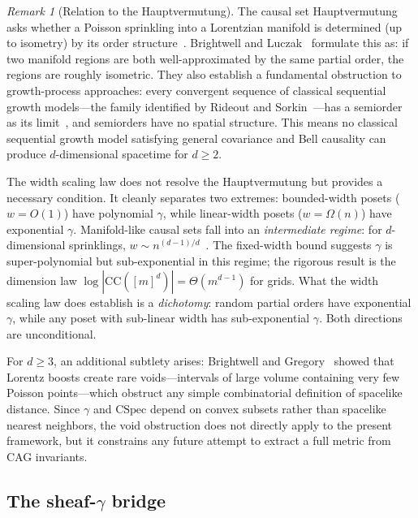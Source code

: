 \documentclass[11pt,a4paper]{article}
\theoremstyle{plain}
\theoremstyle{definition}
\theoremstyle{remark}
\newtheorem{remark}[theorem]{Remark}
\newcommand{\CSpec}{\mathrm{CSpec}}
\newcommand{\CC}{\mathrm{CC}}
\begin{document}
\begin{remark}[Relation to the Hauptvermutung]
The causal set Hauptvermutung asks whether a Poisson sprinkling into a Lorentzian manifold is determined (up to isometry) by its order structure~\cite{bombelli1987, sorkin2003, malament1977}.
Brightwell and Luczak~\cite{brightwell2015} formulate this as: if two manifold regions are both well-approximated by the same partial order, the regions are roughly isometric.
They also establish a fundamental obstruction to growth-process approaches: every convergent sequence of classical sequential growth models---the family identified by Rideout and Sorkin~\cite{rideout2000}---has a semiorder as its limit~\cite{brightwell2010}, and semiorders have no spatial structure.
This means no classical sequential growth model satisfying general covariance and Bell causality can produce $d$-dimensional spacetime for $d \geq 2$.

The width scaling law does not resolve the Hauptvermutung but provides a necessary condition.
It cleanly separates two extremes: bounded-width posets ($w = O(1)$) have polynomial $\gamma$, while linear-width posets ($w = \Omega(n)$) have exponential $\gamma$.
Manifold-like causal sets fall into an \emph{intermediate regime}: for $d$-dimensional sprinklings, $w \sim n^{(d-1)/d}$~\cite{myrheim1978}. The fixed-width bound suggests $\gamma$ is super-polynomial but sub-exponential in this regime; the rigorous result is the dimension law $\log|\CC([m]^d)| = \Theta(m^{d-1})$ for grids.
What the width scaling law does establish is a \emph{dichotomy}: random partial orders have exponential $\gamma$, while any poset with sub-linear width has sub-exponential $\gamma$. Both directions are unconditional.

For $d \geq 3$, an additional subtlety arises: Brightwell and Gregory~\cite{brightwell1991} showed that Lorentz boosts create rare voids---intervals of large volume containing very few Poisson points---which obstruct any simple combinatorial definition of spacelike distance.
Since $\gamma$ and $\CSpec$ depend on convex subsets rather than spacelike nearest neighbors, the void obstruction does not directly apply to the present framework, but it constrains any future attempt to extract a full metric from CAG invariants.
\end{remark}


\subsection{The sheaf-$\gamma$ bridge}\label{sec:sheaf:gamma}
\end{document}
